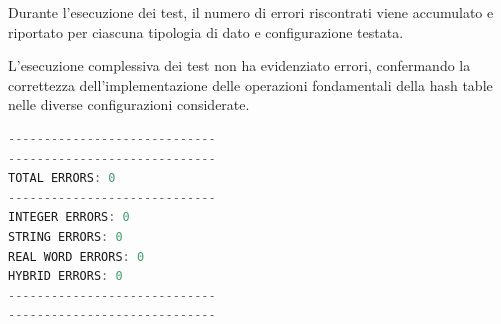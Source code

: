 Durante l’esecuzione dei test, il numero di errori riscontrati viene accumulato e riportato per ciascuna tipologia di dato e configurazione testata.

L’esecuzione complessiva dei test non ha evidenziato errori, confermando la correttezza dell’implementazione delle operazioni fondamentali 
della hash table nelle diverse configurazioni considerate.

\begin{lstlisting}[language=C++, caption=Correctness test result]
-----------------------------
-----------------------------
TOTAL ERRORS: 0
-----------------------------
INTEGER ERRORS: 0
STRING ERRORS: 0
REAL WORD ERRORS: 0
HYBRID ERRORS: 0
-----------------------------
-----------------------------
\end{lstlisting}